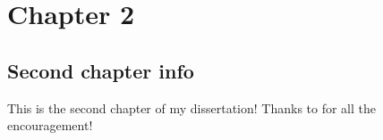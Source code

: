\chapter{Chapter 2}

\section{Second chapter info}

This is the second chapter of my dissertation! Thanks to \cite{agresti2003} for all the encouragement!
